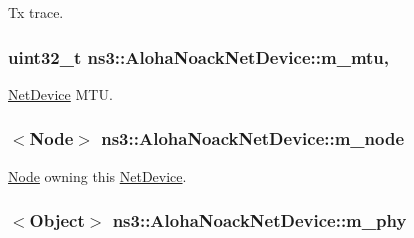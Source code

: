 Tx trace. 

\subsubsection[{\texorpdfstring{m\+\_\+mtu}{m_mtu}}]{\setlength{\rightskip}{0pt plus 5cm}uint32\+\_\+t ns3\+::\+Aloha\+Noack\+Net\+Device\+::m\+\_\+mtu\hspace{0.3cm}{\ttfamily [mutable]}, {\ttfamily [private]}}\hypertarget{classns3_1_1AlohaNoackNetDevice_ac201ebc3d4057060bf1d32fdbf9bc567}{}\label{classns3_1_1AlohaNoackNetDevice_ac201ebc3d4057060bf1d32fdbf9bc567}


\hyperlink{classns3_1_1NetDevice}{Net\+Device} M\+TU. 

\subsubsection[{\texorpdfstring{m\+\_\+node}{m_node}}]{$<${\bf Node}$>$ ns3\+::\+Aloha\+Noack\+Net\+Device\+::m\+\_\+node\hspace{0.3cm}{\ttfamily [private]}}\hypertarget{classns3_1_1AlohaNoackNetDevice_a5b4ab0f0020d7c32aa3c13415b0db277}{}\label{classns3_1_1AlohaNoackNetDevice_a5b4ab0f0020d7c32aa3c13415b0db277}


\hyperlink{classns3_1_1Node}{Node} owning this \hyperlink{classns3_1_1NetDevice}{Net\+Device}. 

\subsubsection[{\texorpdfstring{m\+\_\+phy}{m_phy}}]{$<${\bf Object}$>$ ns3\+::\+Aloha\+Noack\+Net\+Device\+::m\+\_\+phy\hspace{0.3cm}{\ttfamily [private]}}\hypertarget{classns3_1_1AlohaNoackNetDevice_a3c72e3f13e37d6962828611dc5df189d}{}\label{classns3_1_1AlohaNoackNetDevice_a3c72e3f13e37d6962828611dc5df189d}


